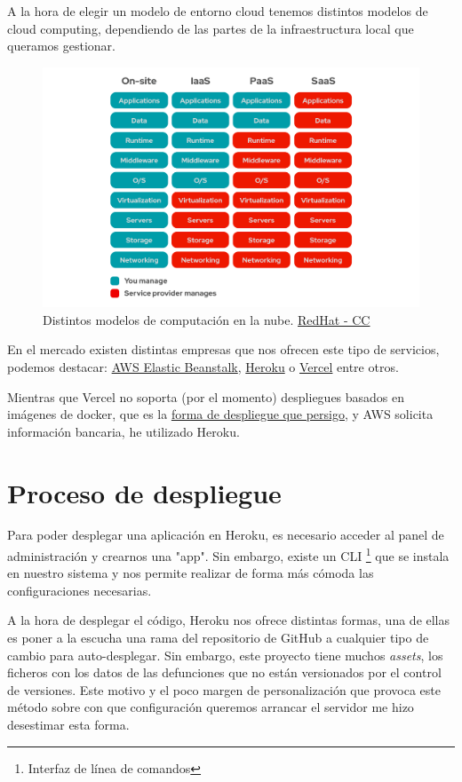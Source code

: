 A la hora de elegir un modelo de entorno cloud tenemos distintos modelos de cloud
computing, dependiendo de las partes de la infraestructura local que queramos gestionar.

\FloatBarrier
\begin{figure}[h]
	\centering	
	\includegraphics[width=\textwidth]{doc/logos/imgs/iaas-paas.png}
    \caption{ Distintos modelos de computación en la nube.
	\href{https://www.redhat.com/es/topics/cloud-computing/iaas-vs-paas-vs-saas}{RedHat -
	CC}}
    \label{fig:tipos-de-cc}
\end{figure}
\FloatBarrier

En el mercado existen distintas empresas que nos ofrecen este tipo de servicios, podemos
destacar: \href{https://aws.amazon.com/es/elasticbeanstalk/}{AWS Elastic Beanstalk},
\href{https://dashboard.heroku.com/login}{Heroku} o \href{https://vercel.com/}{Vercel}
entre otros.

Mientras que Vercel no soporta (por el momento) despliegues basados en imágenes de docker,
que es la \hyperref[sec:proceso-despliegue]{forma de despliegue que persigo}, y AWS
solicita información bancaria, he utilizado Heroku.

\section{Proceso de despliegue}
\label{sec:proceso-despliegue}
Para poder desplegar una aplicación en Heroku, es necesario acceder al panel de
administración y crearnos una "app". Sin embargo, existe un CLI \footnote{Interfaz de
línea de comandos} que se instala en nuestro sistema y nos permite realizar de forma más
cómoda las configuraciones necesarias.

A la hora de desplegar el código, Heroku nos ofrece distintas formas, una de ellas es
poner a la escucha una rama del repositorio de GitHub a cualquier tipo de cambio para
auto-desplegar. Sin embargo, este proyecto tiene muchos \textit{assets}, los ficheros con
los datos de las defunciones que no están versionados por el control de versiones. Este
motivo y el poco margen de personalización que provoca este método sobre con que
configuración queremos arrancar el servidor me hizo desestimar esta forma.

